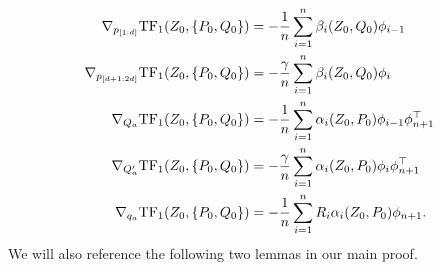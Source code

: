 \documentclass{article}
\newcommand{\tf}{\text{TF}}
\begin{document}
\begin{equation} 
\label{eq: gradient formula}
   \begin{aligned}
      \nabla_{p_{[1:d]}} \tf_1(Z_0,\qty{P_0, Q_0}) & = -\frac{1}{n}\sum_{i=1}^n \beta_i(Z_0, Q_0) \phi_{i-1} \\
      \nabla_{p_{[d+1:2d]}} \tf_1(Z_0, \qty{P_0, Q_0}) & = -\frac{\gamma}{n} \sum_{i=1}^n \beta_i(Z_0, Q_0) \phi_i\\
      \nabla_{Q_a} \tf_1(Z_0,\qty{P_0, Q_0}) & = -\frac{1}{n} \sum_{i=1}^n \alpha_i(Z_0, P_0)  \phi_{i-1} \phi_{n+1}^\top \\
      \nabla_{Q_a'} \tf_1(Z_0,\qty{P_0, Q_0}) & = -\frac{\gamma}{n} \sum_{i=1}^n \alpha_i(Z_0, P_0)  \phi_i \phi_{n+1}^\top \\ 
      \nabla_{q_a} \tf_1(Z_0,\qty{P_0, Q_0}) & =  -\frac{1}{n} \sum_{i=1}^n R_{i} \alpha_i(Z_0, P_0) \phi_{n+1}.
   \end{aligned}
\end{equation}
We will also reference the following two lemmas in our main proof.
\end{document}
